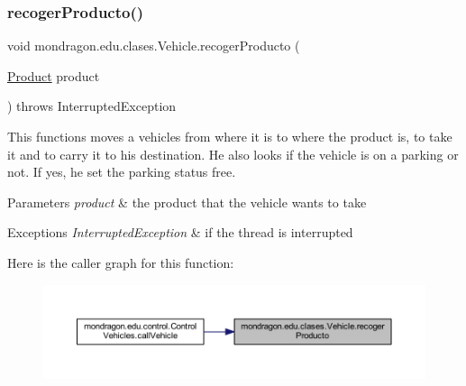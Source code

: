 \subsubsection{\texorpdfstring{recogerProducto()}{recogerProducto()}}
{\footnotesize\ttfamily void mondragon.\+edu.\+clases.\+Vehicle.\+recoger\+Producto (\begin{DoxyParamCaption}\item[{\mbox{\hyperlink{classmondragon_1_1edu_1_1clases_1_1_product}{Product}}}]{product }\end{DoxyParamCaption}) throws Interrupted\+Exception\hspace{0.3cm}{\ttfamily [inline]}}

This functions moves a vehicles from where it is to where the product is, to take it and to carry it to his destination. He also looks if the vehicle is on a parking or not. If yes, he set the parking status free.


\begin{DoxyParams}{Parameters}
{\em product} & the product that the vehicle wants to take \\
\hline
\end{DoxyParams}

\begin{DoxyExceptions}{Exceptions}
{\em Interrupted\+Exception} & if the thread is interrupted \\
\hline
\end{DoxyExceptions}
Here is the caller graph for this function\+:\nopagebreak
\begin{figure}[H]
\begin{center}
\leavevmode
\includegraphics[width=350pt]{classmondragon_1_1edu_1_1clases_1_1_vehicle_aa8c62e43372fe2ea461933e68f69ab2b_icgraph}
\end{center}
\end{figure}
\mbox{\label{classmondragon_1_1edu_1_1clases_1_1_vehicle_a59e0fe87a465b6640295a76d3745a440}} 
